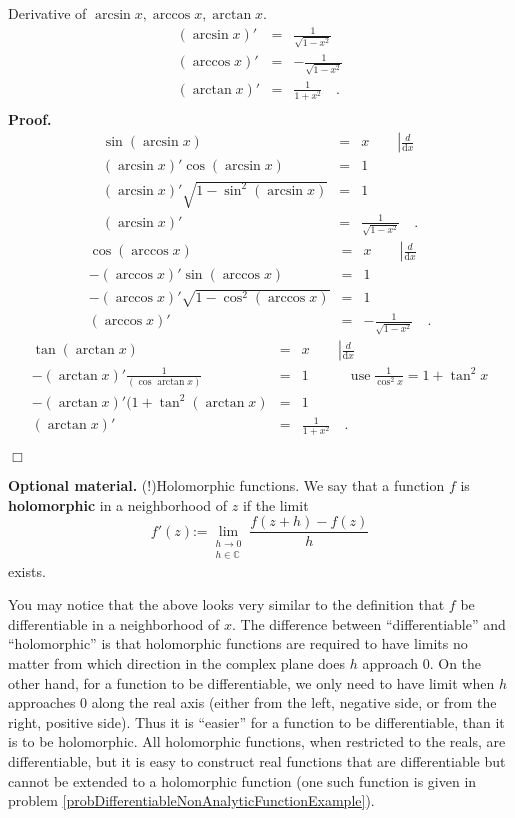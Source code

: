 \documentclass[12pt]{book}
\newcommand{\diff}{\text{d}}
\newcommand{\eqdef}{\textbf{:=}}
\newenvironment{proof}[1][]{ \textbf{Proof#1.} }{$\Box$\medskip}
\renewcommand{\emph}{\textbf}
\begin{document}
Derivative of $\arcsin x, \arccos x, \arctan x$.
\[
\begin{array}{rcl}
(\arcsin x)'&=&\frac{1}{\sqrt{1-x^2}} \\
(\arccos x)'&=&-\frac{1}{\sqrt{1-x^2}}\\
(\arctan x)'&=&\frac{1}{1+x^2}\quad .\\
\end{array}
\]
\begin{proof}
\[
\begin{array}{rcl}
\sin(\arcsin x)&=& x  \quad\quad\left|\frac{d}{\diff x}\right. \\
(\arcsin x)'\cos (\arcsin x) &=& 1\\
(\arcsin x)'\sqrt{1-\sin^2(\arcsin x) } &=& 1\\
(\arcsin x)' &=&\frac{1}{\sqrt{1-x^2}}\quad .
\end{array}
\]
\[
\begin{array}{rcl}
\cos(\arccos x)&=& x \quad\quad\left|\frac{d}{\diff x}\right. \\
-(\arccos x)'\sin (\arccos x) &=& 1\\
-(\arccos x)'\sqrt{1-\cos^2(\arccos x) } &=& 1\\
(\arccos x)' &=&-\frac{1}{\sqrt{1-x^2}}\quad .
\end{array}
\]
\[
\begin{array}{rcl}
\tan(\arctan x)&=& x \quad\quad\left|\frac{d}{\diff x}\right. \\
-(\arctan x)'\frac{1}{ (\cos{\arctan x})} &=& 1 \quad \quad \quad \mathrm{use~} \frac{1}{\cos^2x}= 1+\tan^2x\\
-(\arctan x)'(1+\tan^2(\arctan x) &=& 1\\
(\arctan x)' &=&\frac{1}{1+x^2}\quad .
\end{array}
\]

\end{proof}


\textbf{Optional material.} (!)Holomorphic functions. We say that a function $f$ is \emph{holomorphic} in a neighborhood of  $z$ if the limit 
\[
f'(z)\eqdef \lim_{\substack{h\to 0\\ h\in \mathbb C}} \frac{ f(z+h)-f(z)}{h}
\]
exists.

You may notice that the above looks very similar to the definition that $f$ be differentiable in a neighborhood of $x$. The difference between ``differentiable'' and ``holomorphic'' is that holomorphic functions are required to have limits no matter from which direction in the complex plane does $h$ approach $0$. On the other hand, for a function to be differentiable, we only need to have limit when $h$ approaches $0$ along the real axis (either from the left, negative side, or from the right, positive side). Thus it is ``easier'' for a function to be differentiable, than it is to be holomorphic. All holomorphic functions, when restricted to the reals, are differentiable, but it is easy to construct real functions that are differentiable but cannot be extended to a holomorphic function (one such function is given in problem \ref{probDifferentiableNonAnalyticFunctionExample}).
\end{document}

